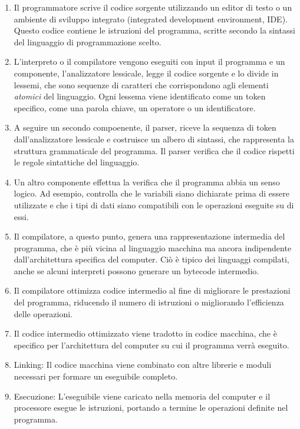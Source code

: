 \documentclass[
  letterpaper,
]{scrbook}
\begin{document}
\begin{enumerate}
\def\labelenumi{\arabic{enumi}.}
\item
  Il programmatore scrive il codice sorgente utilizzando un editor di
  testo o un ambiente di sviluppo integrato (integrated development
  environment, IDE). Questo codice contiene le istruzioni del programma,
  scritte secondo la sintassi del linguaggio di programmazione scelto.
\item
  L'interpreto o il compilatore vengono eseguiti con input il programma
  e un componente, l'analizzatore lessicale, legge il codice sorgente e
  lo divide in lessemi, che sono sequenze di caratteri che corrispondono
  agli elementi \emph{atomici} del linguaggio. Ogni lessema viene
  identificato come un token specifico, come una parola chiave, un
  operatore o un identificatore.
\item
  A seguire un secondo compoenente, il parser, riceve la sequenza di
  token dall'analizzatore lessicale e costruisce un albero di sintassi,
  che rappresenta la struttura grammaticale del programma. Il parser
  verifica che il codice rispetti le regole sintattiche del linguaggio.
\item
  Un altro componente effettua la verifica che il programma abbia un
  senso logico. Ad esempio, controlla che le variabili siano dichiarate
  prima di essere utilizzate e che i tipi di dati siano compatibili con
  le operazioni eseguite su di essi.
\item
  Il compilatore, a questo punto, genera una rappresentazione intermedia
  del programma, che è più vicina al linguaggio macchina ma ancora
  indipendente dall'architettura specifica del computer. Ciò è tipico
  dei linguaggi compilati, anche se alcuni interpreti possono generare
  un bytecode intermedio.
\item
  Il compilatore ottimizza codice intermedio al fine di migliorare le
  prestazioni del programma, riducendo il numero di istruzioni o
  migliorando l'efficienza delle operazioni.
\item
  Il codice intermedio ottimizzato viene tradotto in codice macchina,
  che è specifico per l'architettura del computer su cui il programma
  verrà eseguito.
\item
  Linking: Il codice macchina viene combinato con altre librerie e
  moduli necessari per formare un eseguibile completo.
\item
  Esecuzione: L'eseguibile viene caricato nella memoria del computer e
  il processore esegue le istruzioni, portando a termine le operazioni
  definite nel programma.
\end{enumerate}
\end{document}
